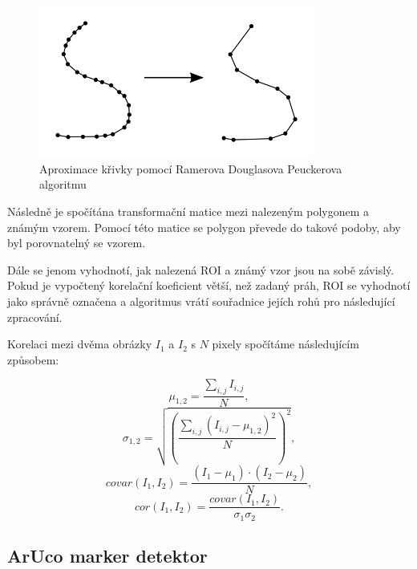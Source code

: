 \documentclass[twoside]{ctuthesis}
\theoremstyle{plain}
\theoremstyle{definition}
\theoremstyle{note}
\begin{document}
\begin{figure}
	
	\caption{Aproximace křivky pomocí Ramerova Douglasova Peuckerova algoritmu}
	
	\label{approx}
	\includegraphics[width=0.8\textwidth]{images/2/approx.png}
\end{figure}


Následně je spočítána transformační matice mezi nalezeným polygonem a známým vzorem. Pomocí této matice se polygon převede do takové podoby, aby byl porovnatelný se vzorem.

Dále se jenom vyhodnotí, jak nalezená ROI a známý vzor jsou na sobě závislý. Pokud je vypočtený korelační koeficient větší, než zadaný práh, ROI se vyhodnotí jako správně označena a algoritmus vrátí souřadnice jejích rohů pro následující zpracování.

Korelaci mezi dvěma obrázky $I_1$ a $I_2$ s $N$ pixely spočítáme následujícím způsobem:

	\begin{equation}
	\mu_{1,2} = \frac{\sum_{i,j}I_{i,j}}{N},
	\end{equation}
	\begin{equation}
	\sigma_{1,2} = \sqrt{\left(\frac{\sum_{i,j}(I_{i,j} - \mu_{1,2})^2}{N}\right)^2},
	\end{equation}
	\begin{equation}
	covar(I_1, I_2) = \frac{(I_1 - \mu_1)\cdot(I_2 - \mu_2)}{N},
	\end{equation}	
	\begin{equation}
	cor(I_1, I_2) = \frac{covar(I_1, I_2)}{\sigma_1 \sigma_2}.
	\end{equation}
	
\subsection{ArUco marker detektor}
\label{aruco_marker}
	
\end{document}
